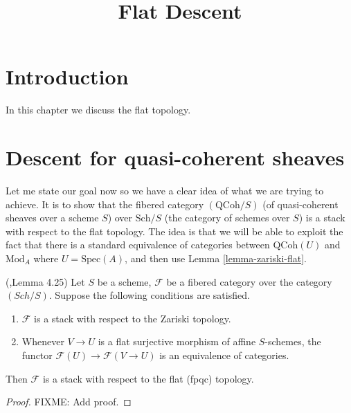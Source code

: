 

%


\title{Flat Descent}

\maketitle

\tableofcontents

\section{Introduction}
\label{section-introduction}

\noindent
In this chapter we discuss the flat topology.

\section{Descent for quasi-coherent sheaves}
\label{section-equivalence}

\noindent
Let me state our goal now so we have a clear idea of what we are
trying to achieve. It is to show that the fibered category $(\text{QCoh}/S)$
(of quasi-coherent sheaves over a scheme $S$) over $\text{Sch}/S$ (the
category of schemes over $S$) is a stack with respect to the flat
topology.  The idea is that we will be able to exploit the fact that
there is a standard equivalence of categories between $\text{QCoh}(U)$ and
$\text{Mod}_A$ where $U = \text{Spec}(A)$, and then use Lemma 
\ref{lemma-zariski-flat}.

\begin{lemma}
\label{lemma-zariski-flat}
(\cite{Vis2},Lemma 4.25)
Let $S$ be a scheme, $\mathcal F$ be a fibered category over the
category $(Sch/S)$.  Suppose the following conditions are satisfied.
\begin{enumerate}
\item $\mathcal F$ is a stack with respect to the Zariski topology.
\item Whenever $V \rightarrow U$ is a flat surjective morphism of affine
$S$-schemes, the functor
$\mathcal F(U) \rightarrow  \mathcal F(V \rightarrow U)$ is an equivalence of
categories.
\end{enumerate}
Then $\mathcal F$ is a stack with respect to the flat (fpqc) topology.	
\end{lemma}
\begin{proof}
  FIXME: Add proof.
\end{proof}

